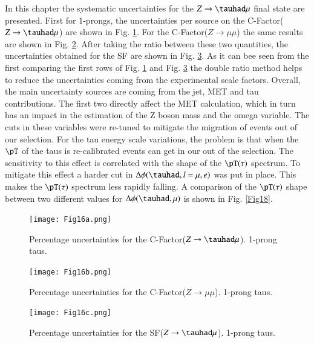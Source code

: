 In this chapter the systematic uncertainties for the $Z\to\tauhad\mu$ final state are presented. First for 1-prongs, the uncertainties per source on the C-Factor($Z\to\tauhad \mu$) are shown in Fig. \ref{Fig16a}. For the C-Factor($Z\to\mu\mu$) the same results are shown in Fig. \ref{Fig16b}. After taking the ratio between these two quantities, the uncertainties obtained for the SF are shown in Fig. \ref{Fig16c}. As it can bee seen from the first comparing the first rows of Fig. \ref{Fig16a} and Fig. \ref{Fig16c} the double ratio method helps to reduce the uncertainties coming from the experimental scale factors. Overall, the main uncertainty sources are coming from the jet, MET and tau contributions. The first two directly affect the MET calculation, which in turn has an impact in the estimation of the Z boson mass and the omega variable. The cuts in these variables were re-tuned to mitigate the migration of events out of our selection. For the tau energy scale variations, the problem is that when the $\pT$ of the taus is re-calibrated events can get in our out of the selection. The sensitivity to this effect is correlated with the shape of the $\pT(\tau)$ spectrum. To mitigate this effect a harder cut in $\Delta\phi(\tauhad ,l=\mu , e)$ was put in place. This makes the $\pT(\tau)$ spectrum less rapidly falling. A comparison of the $\pT(\tau)$ shape between two different values for $\Delta\phi(\tauhad ,\mu)$ is shown in Fig. \ref{Fig18}.    

\begin{figure}[htbp]
	\centering
	\texttt{[image: Fig16a.png]}
	\caption{Percentage uncertainties for the C-Factor($Z\to\tauhad\mu$). 1-prong taus.}
	\label{Fig16a}
\end{figure}
\begin{figure}[htbp]
	\centering
	\texttt{[image: Fig16b.png]}
	\caption{Percentage uncertainties for the C-Factor($Z\to\mu\mu$). 1-prong taus.}
	\label{Fig16b}
\end{figure}
\begin{figure}[htbp]
	\centering
	\texttt{[image: Fig16c.png]}
	\caption{Percentage uncertainties for the SF($Z\to\tauhad\mu$). 1-prong taus.}
	\label{Fig16c}
\end{figure}

